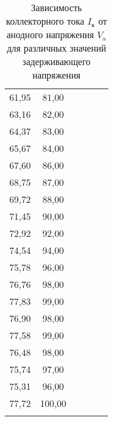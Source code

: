 \documentclass[a4paper, 12pt]{article}
\begin{document}
\begin{longtable}{|c|c|c|c|c|c|}
61,95          & 81,00           & \multicolumn{2}{c|}{}                   & \multicolumn{2}{c|}{}                   \\ \cline{1-2}
63,16          & 82,00           & \multicolumn{2}{c|}{}                   & \multicolumn{2}{c|}{}                   \\ \cline{1-2}
64,37          & 83,00           & \multicolumn{2}{c|}{}                   & \multicolumn{2}{c|}{}                   \\ \cline{1-2}
65,67          & 84,00           & \multicolumn{2}{c|}{}                   & \multicolumn{2}{c|}{}                   \\ \cline{1-2}
67,60          & 86,00           & \multicolumn{2}{c|}{}                   & \multicolumn{2}{c|}{}                   \\ \cline{1-2}
68,75          & 87,00           & \multicolumn{2}{c|}{}                   & \multicolumn{2}{c|}{}                   \\ \cline{1-2}
69,72          & 88,00           & \multicolumn{2}{c|}{}                   & \multicolumn{2}{c|}{}                   \\ \cline{1-2}
71,45          & 90,00           & \multicolumn{2}{c|}{}                   & \multicolumn{2}{c|}{}                   \\ \cline{1-2}
72,92          & 92,00           & \multicolumn{2}{c|}{}                   & \multicolumn{2}{c|}{}                   \\ \cline{1-2}
74,54          & 94,00           & \multicolumn{2}{c|}{}                   & \multicolumn{2}{c|}{}                   \\ \cline{1-2}
75,78          & 96,00           & \multicolumn{2}{c|}{}                   & \multicolumn{2}{c|}{}                   \\ \cline{1-2}
76,76          & 98,00           & \multicolumn{2}{c|}{}                   & \multicolumn{2}{c|}{}                   \\ \cline{1-2}
77,83          & 99,00           & \multicolumn{2}{c|}{}                   & \multicolumn{2}{c|}{}                   \\ \cline{1-2}
76,90          & 98,00           & \multicolumn{2}{c|}{}                   & \multicolumn{2}{c|}{}                   \\ \cline{1-2}
77,58          & 99,00           & \multicolumn{2}{c|}{}                   & \multicolumn{2}{c|}{}                   \\ \cline{1-2}
76,48          & 98,00           & \multicolumn{2}{c|}{}                   & \multicolumn{2}{c|}{}                   \\ \cline{1-2}
75,74          & 97,00           & \multicolumn{2}{c|}{}                   & \multicolumn{2}{c|}{}                   \\ \cline{1-2}
75,31          & 96,00           & \multicolumn{2}{c|}{}                   & \multicolumn{2}{c|}{}                   \\ \cline{1-2}
77,72          & 100,00          & \multicolumn{2}{c|}{}
& \multicolumn{2}{c|}{}                   \\ \hline

\caption{Зависимость коллекторного тока $I_\text{к}$ от анодного
    напряжения $V_\text{a}$ для различных значений задерживающего
напряжения
}
\end{longtable}
\end{document}
